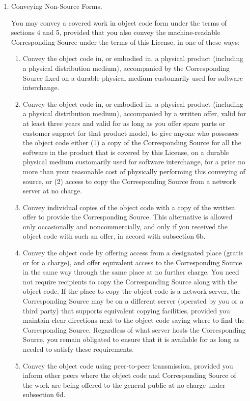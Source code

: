 \documentclass{article}
\begin{document}
\begin{enumerate}[\hspace{-18pt}1.]
\item Conveying Non-Source Forms. 

You may convey a covered work in object code form under the terms of sections 4 and 5, provided that you also convey the machine-readable Corresponding Source under the terms of this License, in one of these ways:
\begin{enumerate}
  \item Convey the object code in, or embodied in, a physical product (including a physical distribution medium), accompanied by the Corresponding Source fixed on a durable physical medium customarily used for software interchange.
  \item Convey the object code in, or embodied in, a physical product (including a physical distribution medium), accompanied by a written offer, valid for at least three years and valid for as long as you offer spare parts or customer support for that product model, to give anyone who possesses the object code either (1) a copy of the Corresponding Source for all the software in the product that is covered by this License, on a durable physical medium customarily used for software interchange, for a price no more than your reasonable cost of physically performing this conveying of source, or (2) access to copy the Corresponding Source from a network server at no charge.
  \item Convey individual copies of the object code with a copy of the written offer to provide the Corresponding Source.  This alternative is allowed only occasionally and noncommercially, and only if you received the object code with such an offer, in accord with subsection 6b.
  \item Convey the object code by offering access from a designated place (gratis or for a charge), and offer equivalent access to the Corresponding Source in the same way through the same place at no further charge. You need not require recipients to copy the Corresponding Source along with the object code.  If the place to copy the object code is a network server, the Corresponding Source may be on a different server (operated by you or a third party) that supports equivalent copying facilities, provided you maintain clear directions next to the object code saying where to find the Corresponding Source.  Regardless of what server hosts the Corresponding Source, you remain obligated to ensure that it is available for as long as needed to satisfy these requirements.
  \item Convey the object code using peer-to-peer transmission, provided you inform other peers where the object code and Corresponding Source of the work are being offered to the general public at no charge under subsection 6d.
\end{enumerate}


\end{enumerate}
\end{document}

